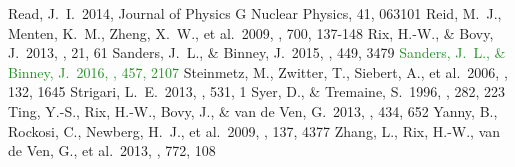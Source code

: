 \documentclass[iop,revtex4]{emulateapj}
\newcommand{\NEW}[1]{\textcolor{ForestGreen}{#1}}
\begin{document}
\begin{thebibliography}{}
 Read, J.~I.\ 2014, Journal of Physics G Nuclear Physics, 41, 063101 
 Reid, M.~J., Menten, K.~M., Zheng, X.~W., et al.\ 2009, \apj, 700, 137-148 
 Rix, H.-W., \& Bovy, J.\ 2013, \aapr, 21, 61
 Sanders, J.~L., \& Binney, J.\ 2015, \mnras, 449, 3479
 \NEW{Sanders, J.~L., \& Binney, J.\ 2016, \mnras, 457, 2107}
 Steinmetz, M., Zwitter, T., Siebert, A., et al.\ 2006, \aj, 132, 1645 
 Strigari, L.~E.\ 2013, \physrep, 531, 1 
 Syer, D., \& Tremaine, S.\ 1996, \mnras, 282, 223 
 Ting, Y.-S., Rix, H.-W., Bovy, J., \& van de Ven, G.\ 2013, \mnras, 434, 652
 Yanny, B., Rockosi, C., Newberg, H.~J., et al.\ 2009, \aj, 137, 4377 
 Zhang, L., Rix, H.-W., van de Ven, G., et al.\ 2013, \apj, 772, 108
\end{thebibliography}
\end{document}
